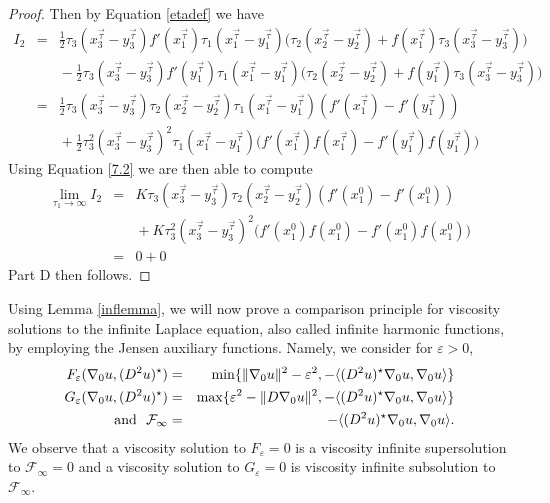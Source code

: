 \documentclass[reqno]{amsart}
\newcommand{\ip}[2]{\ensuremath{\langle #1 , #2 \rangle}}
\begin{document}
\begin{proof}
Then by  Equation \eqref{etadef} we have
\begin{eqnarray*}
I_2 & = & \frac{1}{2}\tau_3(x^{\vec{\tau}}_3-y^{\vec{\tau}}_3)f'(x^{\vec{\tau}}_1)\tau_1(x^{\vec{\tau}}_1-y^{\vec{\tau}}_1)  \Big(\tau_2(x^{\vec{\tau}}_2-y^{\vec{\tau}}_2) +f(x_1^{\vec{\tau}})\tau_3(x^{\vec{\tau}}_3-y^{\vec{\tau}}_3)\Big) \\
&  & \mbox{}- \frac{1}{2}\tau_3(x^{\vec{\tau}}_3-y^{\vec{\tau}}_3)f'(y^{\vec{\tau}}_1)\tau_1(x^{\vec{\tau}}_1-y^{\vec{\tau}}_1)  \Big(\tau_2(x^{\vec{\tau}}_2-y^{\vec{\tau}}_2)+f(y_1^{\vec{\tau}})\tau_3(x^{\vec{\tau}}_3-y^{\vec{\tau}}_3)\Big) \\
 & = & \frac{1}{2}\tau_3(x^{\vec{\tau}}_3-y^{\vec{\tau}}_3)\tau_2(x^{\vec{\tau}}_2-y^{\vec{\tau}}_2)\tau_1(x^{\vec{\tau}}_1-y^{\vec{\tau}}_1)(f'(x^{\vec{\tau}}_1)-f'(y^{\vec{\tau}}_1))\\
  & & \mbox{}+\frac{1}{2}\tau^2_3(x^{\vec{\tau}}_3-y^{\vec{\tau}}_3)^2\tau_1(x^{\vec{\tau}}_1-y^{\vec{\tau}}_1)\bigg(f'(x^{\vec{\tau}}_1)f(x^{\vec{\tau}}_1)-f'(y^{\vec{\tau}}_1)f(y^{\vec{\tau}}_1)\bigg)
\end{eqnarray*}
Using Equation \eqref{7.2} we are then able to compute 
\begin{eqnarray*}
\lim_{\tau_1\to\infty} I_2 & = & 
K\tau_3(x^{\vec{\tau}}_3-y^{\vec{\tau}}_3)\tau_2(x^{\vec{\tau}}_2-y^{\vec{\tau}}_2)(f'(x^0_1)-f'(x^0_1))\\
  & & \mbox{}+K\tau^2_3(x^{\vec{\tau}}_3-y^{\vec{\tau}}_3)^2\bigg(f'(x^0_1)f(x^0_1)-f'(x^0_1)f(x^0_1)\bigg)\\
  & = & 0+0 
\end{eqnarray*}
Part D then follows. 
\end{proof}
Using Lemma \ref{inflemma}, we will now prove a comparison principle for viscosity solutions to the infinite Laplace equation, also called infinite harmonic functions, by employing the Jensen auxiliary functions. \cite{Je:ULE}  Namely, we consider for $\varepsilon > 0$, 
\begin{eqnarray*}
F_\varepsilon(\nabla_0u,(D^2u)^\star) & = & 
 \min\{\|\nabla_0u\|^2-\varepsilon^2,
-\ip{(D^2u)^\star \nabla_0u}{\nabla_0u}\} \\
G_\varepsilon(\nabla_0u,(D^2u)^\star) & = & 
 \max\{\varepsilon^2-\|D\nabla_0u\|^2,
-\ip{(D^2u)^\star \nabla_0u}{\nabla_0u}\} \\
\textmd{and\ \ } \mathcal{F}_\infty & = & -\ip{(D^2u)^\star \nabla_0u}{\nabla_0u}.
\end{eqnarray*}
We observe that a viscosity solution to $F_\varepsilon=0$ is a viscosity infinite supersolution to $\mathcal{F}_\infty=0$ and a viscosity solution to $G_\varepsilon=0$ is viscosity infinite subsolution to $\mathcal{F}_\infty$.
\end{document}
